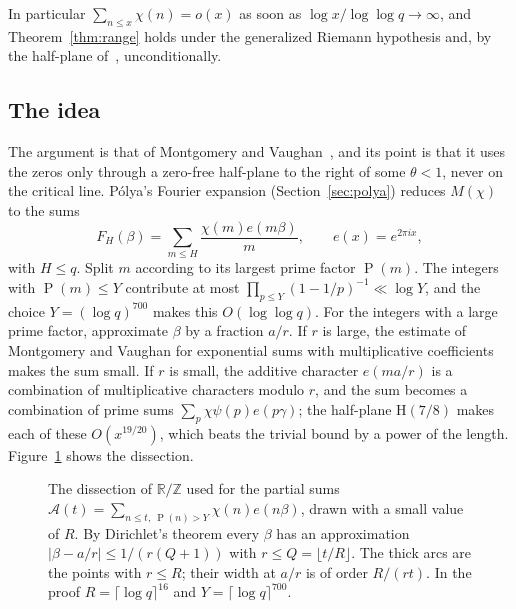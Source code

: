 \documentclass[11pt]{amsart}
\theoremstyle{definition}
\theoremstyle{remark}
\numberwithin{equation}{section}
\newcommand{\e}{e}
\DeclareMathOperator{\gpf}{P}
\begin{document}
In particular $\sum_{n\le x}\chi(n)=o(x)$ as soon as $\log x/\log\log
q\to\infty$, and Theorem~\ref{thm:range} holds under the generalized Riemann
hypothesis and, by the half-plane of~\cite{openai}, unconditionally.

\subsection*{The idea}

The argument is that of Montgomery and Vaughan~\cite{mv77}, and its point is
that it uses the zeros only through a zero-free half-plane to the right of
some $\theta<1$, never on the critical line. Pólya's Fourier expansion
(Section~\ref{sec:polya}) reduces $M(\chi)$ to the sums
\[
F_H(\beta)=\sum_{m\le H}\frac{\chi(m)\e(m\beta)}m,\qquad\e(x)=\e^{2\pi ix},
\]
with $H\le q$. Split $m$ according to its largest prime factor $\gpf(m)$. The
integers with $\gpf(m)\le Y$ contribute at most $\prod_{p\le Y}(1-1/p)^{-1}\ll\log
Y$, and the choice $Y=(\log q)^{700}$ makes this $O(\log\log q)$. For the
integers with a large prime factor, approximate $\beta$ by a fraction $a/r$.
If $r$ is large, the estimate of Montgomery and Vaughan for exponential sums
with multiplicative coefficients makes the sum small. If $r$ is small, the
additive character $\e(ma/r)$ is a combination of multiplicative characters
modulo $r$, and the sum becomes a combination of prime sums
$\sum_p\chi\psi(p)\e(p\gamma)$; the half-plane $\mathrm H(7/8)$ makes each of
these $O(x^{19/20})$, which beats the trivial bound by a power of the length.
Figure~\ref{fig:arcs} shows the dissection.

\begin{figure}[t]
\centering
{}
\caption{The dissection of $\mathbb R/\mathbb Z$ used for the partial sums
$\mathcal A(t)=\sum_{n\le t,\ \gpf(n)>Y}\chi(n)\e(n\beta)$, drawn with a small
value of $R$. By Dirichlet's theorem every $\beta$ has an approximation
$|\beta-a/r|\le1/(r(Q+1))$ with $r\le Q=\lfloor t/R\rfloor$. The thick arcs are
the points with $r\le R$; their width at $a/r$ is of order $R/(rt)$. In the
proof $R=\lceil\log q\rceil^{16}$ and $Y=\lceil\log q\rceil^{700}$.}
\label{fig:arcs}
\end{figure}
\end{document}
